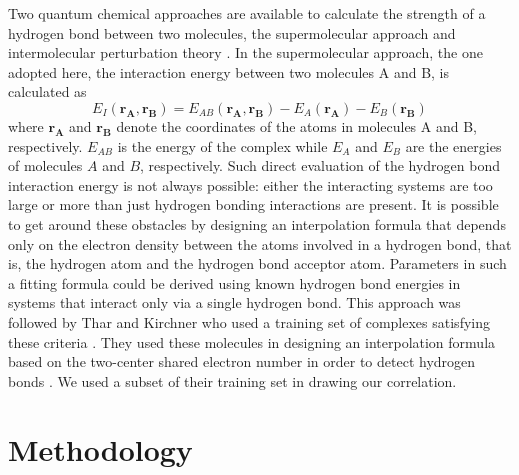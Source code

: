 \documentclass[11pt]{report}
\begin{document}
Two quantum chemical approaches are available to
calculate the strength of a hydrogen bond between two molecules, the supermolecular approach and intermolecular perturbation theory
\cite{Scheiner2007,Jeziorski2002}. In the supermolecular approach, the one adopted here, the interaction energy between two molecules A and B, is calculated as
\begin{equation}
\label{eq:HBP-superMol}
 E_{I}\left(\mathbf{r_{A}},\mathbf{r_{B}}\right) =  
 E_{AB}\left(\mathbf{r_{A}},\mathbf{r_{B}}\right) -  E_{A}\left(\mathbf{r_{A}}\right) 
 -  E_{B}\left(\mathbf{r_{B}}\right)
\end{equation}
where  $\mathbf{r_{A}}$ and $\mathbf{r_{B}}$ denote the coordinates of the atoms in molecules A and B, respectively. $E_{AB}$ is the energy of the complex while $E_A$ and $E_B$ are the energies of molecules $A$ and $B$, respectively. Such direct evaluation of the hydrogen bond interaction energy is not always possible: either the interacting systems are too large or more than just hydrogen bonding interactions are present. It is possible to get around these obstacles by designing an interpolation formula that depends only on the electron density between the atoms involved in a hydrogen bond, that is, the hydrogen atom and the hydrogen bond acceptor atom. Parameters in such a fitting formula could be derived using known hydrogen bond energies in systems that interact only via a single hydrogen bond. This approach was followed by Thar and Kirchner who used a training set of complexes satisfying these criteria
\cite{Thar2006}. They used these molecules in designing an interpolation formula based on the two-center shared electron number in order to detect hydrogen bonds
\cite{Thar2006}. We used a subset of their training set in drawing our correlation.

\section{Methodology}
\label{s:HBP-Methods}
\end{document}
